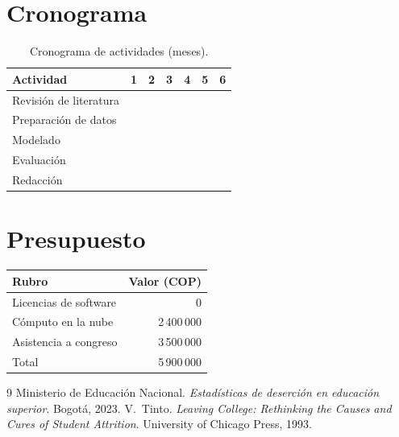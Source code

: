 \documentclass[12pt,letterpaper]{article}
\begin{document}
\section{Cronograma}
\begin{table}[h]
\centering
\caption{Cronograma de actividades (meses).}
\begin{tabular}{l|cccccc}
\toprule
Actividad & 1 & 2 & 3 & 4 & 5 & 6 \\
\midrule
Revisión de literatura & \cellcolor{blue!30} & \cellcolor{blue!30} & & & & \\
Preparación de datos & & \cellcolor{blue!30} & \cellcolor{blue!30} & & & \\
Modelado & & & \cellcolor{blue!30} & \cellcolor{blue!30} & & \\
Evaluación & & & & \cellcolor{blue!30} & \cellcolor{blue!30} & \\
Redacción & & & & & \cellcolor{blue!30} & \cellcolor{blue!30} \\
\bottomrule
\end{tabular}
\end{table}

\section{Presupuesto}
\begin{tabular}{lr}
\toprule
Rubro & Valor (COP) \\
\midrule
Licencias de software & 0 \\
Cómputo en la nube & 2\,400\,000 \\
Asistencia a congreso & 3\,500\,000 \\
\midrule
Total & 5\,900\,000 \\
\bottomrule
\end{tabular}

\begin{thebibliography}{9}
 Ministerio de Educación Nacional. \emph{Estadísticas de deserción en
educación superior}. Bogotá, 2023.
 V.~Tinto. \emph{Leaving College: Rethinking the Causes and Cures of
Student Attrition}. University of Chicago Press, 1993.
\end{thebibliography}
\end{document}
